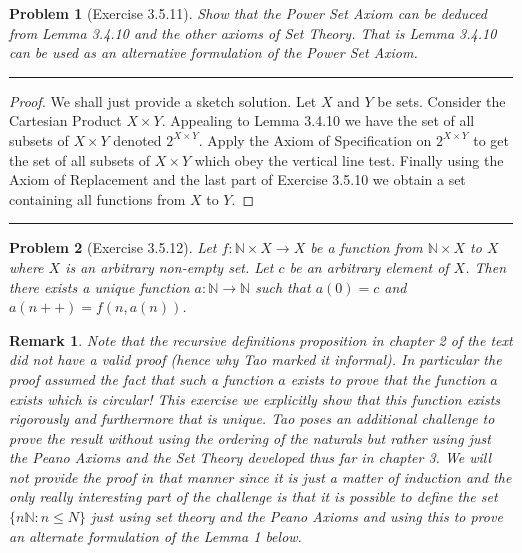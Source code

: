 \documentclass{article}
\newcommand{\lined}{\noindent\rule{\textwidth}{1pt}}
\newtheorem*{problem}{Problem}
\newtheorem*{remark}{Remark}
\begin{document}
	\newpage
	
	\begin{problem}[Exercise 3.5.11]
		Show that the Power Set Axiom can be deduced from Lemma 3.4.10 and the other axioms of Set Theory. That is Lemma 3.4.10 can be used as an alternative formulation of the Power Set Axiom. 
	\end{problem}
	
	\lined
		\begin{proof}
			We shall just provide a sketch solution. Let $X$ and $Y$ be sets. Consider the Cartesian Product $X \times Y$. Appealing to Lemma 3.4.10 we have the set of all subsets of $X \times Y$ denoted $2^{X \times Y}$. Apply the Axiom of Specification on $2^{X \times Y}$ to get the set of all subsets of $X \times Y$ which obey the vertical line test. Finally using the Axiom of Replacement and the last part of Exercise 3.5.10 we obtain a set containing all functions from $X$ to $Y$.
		\end{proof}
	\lined
	
	\newpage
	
	\begin{problem}[Exercise 3.5.12]
		Let $f:\mathbb{N} \times X \rightarrow X$ be a function from $\mathbb{N} \times X$ to $X$ where $X$ is an arbitrary non-empty set. Let $c$ be an arbitrary element of $X$. Then there exists a unique 	function $a:\mathbb{N} \rightarrow \mathbb{N}$ such that $a(0) = c$
		and $a(n++) = f(n, a(n))$. 
	\end{problem}
	
	\begin{remark}
		Note that the recursive definitions proposition in chapter 2 of the text did not have a valid proof (hence why Tao marked it informal). In particular the proof assumed the fact that such a function $a$ exists to prove that the function $a$ exists which is circular! This exercise we explicitly show that this function exists rigorously and furthermore that is unique. Tao poses an additional challenge to prove the result without using the ordering of the naturals but rather using just the Peano Axioms and the Set Theory developed thus far in chapter 3. We will not provide the proof in that manner since it is just a matter of induction and the only really interesting part of the challenge is that it is possible to define the set $\{n \mathbb{N}:n \leq N\}$ just using set theory and the Peano Axioms and using this to prove an alternate formulation of the Lemma 1 below. 
	\end{remark}
	
\end{document}
